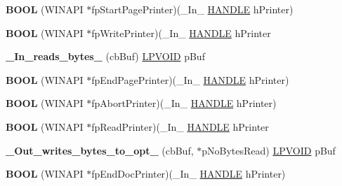 \begin{DoxyCompactItemize}
{\bfseries B\+O\+OL} (W\+I\+N\+A\+PI $\ast$fp\+Start\+Page\+Printer)(\+\_\+\+In\+\_\+ \hyperlink{interfacevoid}{H\+A\+N\+D\+LE} h\+Printer)
\item 
\mbox{\label{struct___p_r_i_n_t_p_r_o_v_i_d_o_r_aaeb24affe0116e964ae441d08efd30ee}} 
{\bfseries B\+O\+OL} (W\+I\+N\+A\+PI $\ast$fp\+Write\+Printer)(\+\_\+\+In\+\_\+ \hyperlink{interfacevoid}{H\+A\+N\+D\+LE} h\+Printer
\item 
\mbox{\label{struct___p_r_i_n_t_p_r_o_v_i_d_o_r_add4abc51674e880dd79bff1bd6140687}} 
{\bfseries \+\_\+\+In\+\_\+reads\+\_\+bytes\+\_\+} (cb\+Buf) \hyperlink{interfacevoid}{L\+P\+V\+O\+ID} p\+Buf
\item 
\mbox{\label{struct___p_r_i_n_t_p_r_o_v_i_d_o_r_ac98803e08ec58df7031f14f2e069652f}} 
{\bfseries B\+O\+OL} (W\+I\+N\+A\+PI $\ast$fp\+End\+Page\+Printer)(\+\_\+\+In\+\_\+ \hyperlink{interfacevoid}{H\+A\+N\+D\+LE} h\+Printer)
\item 
\mbox{\label{struct___p_r_i_n_t_p_r_o_v_i_d_o_r_aef54f024cad9025e191e3621922ea00c}} 
{\bfseries B\+O\+OL} (W\+I\+N\+A\+PI $\ast$fp\+Abort\+Printer)(\+\_\+\+In\+\_\+ \hyperlink{interfacevoid}{H\+A\+N\+D\+LE} h\+Printer)
\item 
\mbox{\label{struct___p_r_i_n_t_p_r_o_v_i_d_o_r_a8f5872f2b37c246506c76d5db480752b}} 
{\bfseries B\+O\+OL} (W\+I\+N\+A\+PI $\ast$fp\+Read\+Printer)(\+\_\+\+In\+\_\+ \hyperlink{interfacevoid}{H\+A\+N\+D\+LE} h\+Printer
\item 
\mbox{\label{struct___p_r_i_n_t_p_r_o_v_i_d_o_r_a94301ecd53b1ea2d6cb561033e8a6e11}} 
{\bfseries \+\_\+\+Out\+\_\+writes\+\_\+bytes\+\_\+to\+\_\+opt\+\_\+} (cb\+Buf, $\ast$p\+No\+Bytes\+Read) \hyperlink{interfacevoid}{L\+P\+V\+O\+ID} p\+Buf
\item 
\mbox{\label{struct___p_r_i_n_t_p_r_o_v_i_d_o_r_a80973788cfa09dd84a5e7d4d86a5bf3b}} 
{\bfseries B\+O\+OL} (W\+I\+N\+A\+PI $\ast$fp\+End\+Doc\+Printer)(\+\_\+\+In\+\_\+ \hyperlink{interfacevoid}{H\+A\+N\+D\+LE} h\+Printer)
\item 

\end{DoxyCompactItemize}
